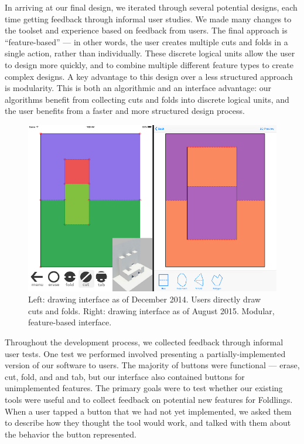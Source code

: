 In arriving at our final design, we iterated through several potential
designs, each time getting feedback through informal user studies. We
made many changes to the toolset and experience based on feedback from
users. The final approach is ``feature-based'' --- in other words, the
user creates multiple cuts and folds in a single action, rather than
individually. These discrete logical units allow the user to design more
quickly, and to combine multiple different feature types to create
complex designs. A key advantage to this design over a less structured
approach is modularity. This is both an algorithmic and an interface
advantage: our algorithms benefit from collecting cuts and folds into
discrete logical units, and the user benefits from a faster and more
structured design process.

\begin{figure}[htbp]
\centering
\includegraphics{figures/31_UI_Interface_Iteration/beforeafterinface.pdf}
\caption{Left: drawing interface as of December 2014. Users directly
draw cuts and folds. Right: drawing interface as of August 2015.
Modular, feature-based interface.}
\end{figure}

Throughout the development process, we collected feedback through
informal user tests. One test we performed involved presenting a
partially-implemented version of our software to users. The majority of
buttons were functional --- erase, cut, fold, and and tab, but our
interface also contained buttons for unimplemented features. The primary
goals were to test whether our existing tools were useful and to collect
feedback on potential new features for Foldlings. When a user tapped a
button that we had not yet implemented, we asked them to describe how
they thought the tool would work, and talked with them about the
behavior the button represented.

